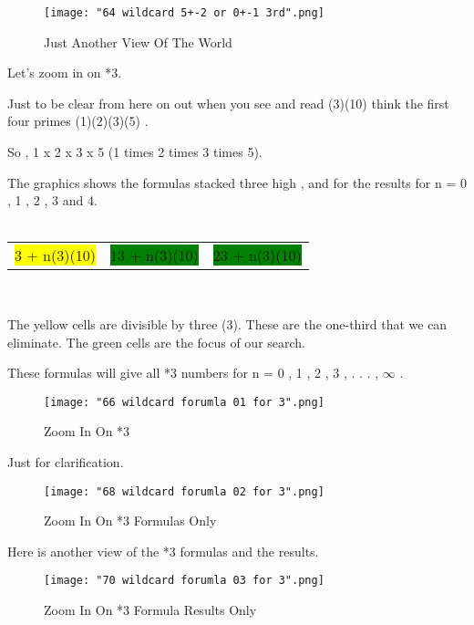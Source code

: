 \documentclass[12pt,letterpaper,oneside,titlepage]{article}
\begin{document}
\begin{figure}[h]
\centering
\texttt{[image: "64 wildcard 5+-2 or 0+-1 3rd".png]}
\caption{Just Another View Of The World}
\end{figure}
\pagebreak


\par 
Let's zoom in on *3. 
\\
\par 
Just to be clear from here on out when you see and read (3)(10) think the first four primes (1)(2)(3)(5) . 
\par  
So , 1 x 2 x 3 x 5 (1 times 2 times 3 times 5). 
\\
\par 
The graphics shows the formulas stacked three high , and for the results for n = 0 , 1 , 2 , 3 and 4.
\\ 
\\
\begin{tabular}{r|r|r}
\colorbox{yellow}{ 3 + n(3)(10) } & \colorbox{green}{ 13 + n(3)(10) }  & \colorbox{green}{ 23 + n(3)(10) } \\ 
\end{tabular} 
\\
\par 
The yellow cells are divisible by three (3). These are the one-third that we can eliminate.
The green cells are the focus of our search. 
\\	
\par 
These formulas will give all *3 numbers for n = 0 , 1 , 2 , 3 , . . . , $\infty$ . 	
\\

\begin{figure}[h]
\centering
\texttt{[image: "66 wildcard forumla 01 for 3".png]}
\caption{Zoom In On *3}
\end{figure}
\pagebreak
	


\par 
Just for clarification.
\begin{figure}[h]
	\centering
	\texttt{[image: "68 wildcard forumla 02 for 3".png]}
	\caption{Zoom In On *3 Formulas Only}
\end{figure}
\pagebreak


\par 
Here is another view of the *3 formulas and the results.
\begin{figure}[h]
	\centering
	\texttt{[image: "70 wildcard forumla 03 for 3".png]}
	\caption{Zoom In On *3 Formula Results Only}
\end{figure}
\pagebreak
\end{document}
